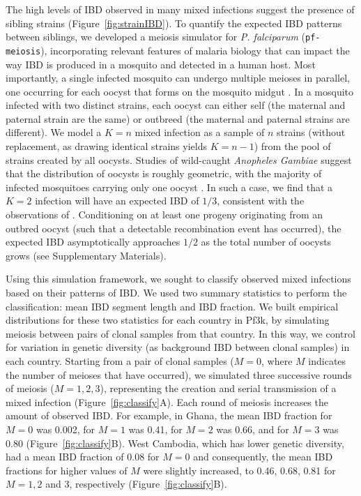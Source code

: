 \documentclass[9pt,lineno]{elife}
\begin{document}
The high levels of IBD observed in many mixed infections suggest the presence of sibling strains (Figure~\ref{fig:strainIBD}). To quantify the expected IBD patterns between siblings, we developed a meiosis simulator for {\it P. falciparum} ({\tt pf-meiosis}), incorporating relevant features of malaria biology that can impact the way IBD is produced in a mosquito and detected in a human host. Most importantly, a single infected mosquito can undergo multiple meioses in parallel, one occurring for each oocyst that forms on the mosquito midgut \citep{Gosh2000}. In a mosquito infected with two distinct strains, each oocyst can either self (the maternal and paternal strain are the same) or outbreed (the maternal and paternal strains are different). We model a $K = n$ mixed infection as a sample of $n$ strains (without replacement, as drawing identical strains yields $K = n-1$) from the pool of strains created by all oocysts. Studies of wild-caught \textit{Anopheles Gambiae} suggest that the distribution of oocysts is roughly geometric, with the majority of infected mosquitoes carrying only one oocyst \citep{Beir1991,Collins1984}. In such a case, we find that a $K=2$ infection will have an expected IBD of $1/3$, consistent with the observations of \citet{Wong2018}.  Conditioning on at least one progeny originating from an outbred oocyst (such that a detectable recombination event has occurred), the expected IBD asymptotically approaches $1/2$ as the total number of oocysts grows (see Supplementary Materials).

Using this simulation framework, we sought to classify observed mixed infections based on their patterns of IBD. We used two summary statistics to perform the classification: mean IBD segment length and IBD fraction. We built empirical distributions for these two statistics for each country in Pf3k, by simulating meiosis between pairs of clonal samples from that country.  In this way, we control for variation in genetic diversity (as background IBD between clonal samples) in each country. Starting from a pair of clonal samples ($M=0$, where $M$ indicates the number of meioses that have occurred), we simulated three successive rounds of meiosis ($M=1, 2, 3$), representing the creation and serial transmission of a mixed infection (Figure~\ref{fig:classify}A). Each round of meiosis increases the amount of observed IBD. For example, in Ghana, the mean IBD fraction for $M=0$ was 0.002, for $M=1$ was 0.41, for $M=2$ was 0.66, and for $M=3$ was 0.80 (Figure~\ref{fig:classify}B). West Cambodia, which has lower genetic diversity, had a mean IBD fraction of 0.08 for $M=0$ and consequently, the mean IBD fractions for higher values of $M$ were slightly increased, to 0.46, 0.68, 0.81 for $M=1, 2$ and $3$, respectively (Figure~\ref{fig:classify}B).
\end{document}
